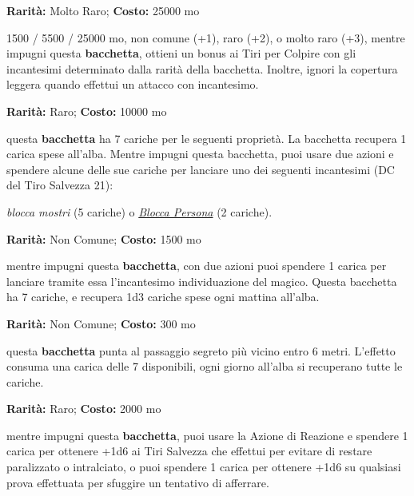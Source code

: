 \begin{multicols}{2}

\textbf{Rarità:} Molto Raro; \textbf{Costo:} 25000 mo

1500 / 5500 / 25000 mo, non comune (+1), raro (+2), o molto raro (+3), mentre impugni questa \textbf{bacchetta}, ottieni un bonus ai Tiri per Colpire con gli incantesimi determinato dalla rarità della bacchetta. Inoltre, ignori la copertura leggera quando effettui un attacco con incantesimo.


\textbf{Rarità:} Raro; \textbf{Costo:} 10000 mo

questa \textbf{bacchetta} ha 7 cariche per le seguenti proprietà. La bacchetta recupera 1 carica spese all'alba. Mentre impugni questa bacchetta, puoi usare due azioni e spendere alcune delle sue cariche per lanciare uno dei seguenti incantesimi (DC del Tiro Salvezza 21):

\emph{blocca mostri} (5 cariche) o \emph{\hyperlink{Blocca Persona}{Blocca Persona}} (2 cariche).


\textbf{Rarità:} Non Comune; \textbf{Costo:} 1500 mo

mentre impugni questa \textbf{bacchetta}, con due azioni puoi spendere 1 carica per lanciare tramite essa l'incantesimo individuazione del magico. Questa bacchetta ha 7 cariche, e recupera 1d3 cariche spese ogni mattina all'alba.


\textbf{Rarità:} Non Comune; \textbf{Costo:} 300 mo

questa \textbf{bacchetta} punta al passaggio segreto più vicino entro 6 metri. L'effetto consuma una carica delle 7 disponibili, ogni giorno all'alba si recuperano tutte le cariche.


\textbf{Rarità:} Raro; \textbf{Costo:} 2000 mo

mentre impugni questa \textbf{bacchetta}, puoi usare la Azione di Reazione e spendere 1 carica per ottenere +1d6 ai Tiri Salvezza che effettui per evitare di restare paralizzato o intralciato, o puoi spendere 1 carica per ottenere +1d6 su qualsiasi prova effettuata per sfuggire un tentativo di afferrare.



\end{multicols}
